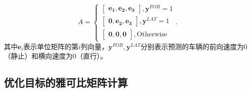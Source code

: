 \begin{equation}
  A = 
  \begin{cases}
    \begin{bmatrix} \symbf{e_1}, \symbf{e_2}, \symbf{e_3}  \end{bmatrix}, \symbf{y}^{FOR} = 1 \\
    \begin{bmatrix} \symbf{0}, \symbf{e_2}, \symbf{e_3}  \end{bmatrix}, \symbf{y}^{LAT} = 1 \\
    \begin{bmatrix} \symbf{0}, \symbf{0}, \symbf{0}  \end{bmatrix}, \text{Otherwise}
  \end{cases}.
\end{equation}
其中$\symbf{e}_i$表示单位矩阵的第$i$列向量，$\symbf{y}^{FOR}, \symbf{y}^{LAT}$分别表示预测的车辆的前向速度为0（静止）和横向速度为0（直行）。

\subsection{优化目标的雅可比矩阵计算}


